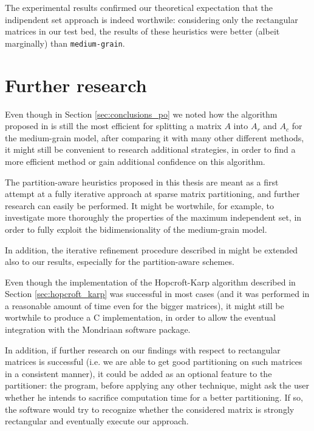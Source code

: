 The experimental results confirmed our theoretical expectation that the indipendent set approach is indeed worthwile: considering only the rectangular matrices in our test bed, the results of these heuristics were better (albeit marginally) than \verb|medium-grain|.

\section{Further research}

Even though in Section \ref{sec:conclusions_po} we noted how the algorithm proposed in \cite{mediumgrain} is still the most efficient for splitting a matrix $A$ into $A_r$ and $A_c$ for the medium-grain model, after comparing it with many other different methods, it might still be convenient to research additional strategies, in order to find a more efficient method or gain additional confidence on this algorithm.

The partition-aware heuristics proposed in this thesis are meant as a first attempt at a fully iterative approach at sparse matrix partitioning, and further research can easily be performed. It might be wortwhile, for example, to investigate more thoroughly the properties of the maximum independent set, in order to fully exploit the bidimensionality of the medium-grain model.

In addition, the iterative refinement procedure described in \cite{mediumgrain} might be extended also to our results, especially for the partition-aware schemes.

Even though the implementation of the Hopcroft-Karp algorithm described in Section \ref{sec:hopcroft_karp} was successful in most cases (and it was performed in a reasonable amount of time even for the bigger matrices), it might still be wortwhile to produce a C implementation, in order to allow the eventual integration with the Mondriaan software package. 

In addition, if further research on our findings with respect to rectangular matrices is successful (i.e. we are able to get good partitioning on such matrices in a consistent manner), it could be added as an optional feature to the partitioner: the program, before applying any other technique, might ask the user whether he intends to sacrifice computation time for a better partitioning. If so, the software would try to recognize whether the considered matrix is strongly rectangular and eventually execute our approach.
